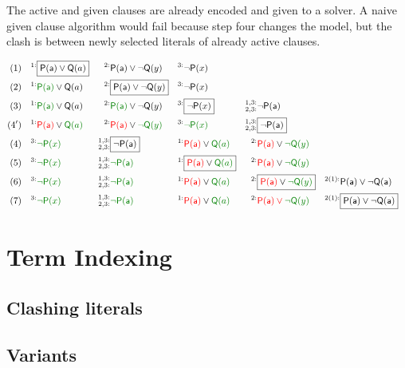 \begin{example}[InstGen]The active and given clauses are already encoded and given to a \SAT solver.
	A naive given clause algorithm would fail because step four changes the model, 
	but the clash is between newly selected literals of already active clauses.
	
	\begin{align*}
	(1)\quad^{1:}&\boxed{\mP(\ma)\lor\mQ(a)} & ^{2:}&\mP(\ma)\lor\lnot\mQ(y) & ^{3:}&\lnot\mP(x)
	\\
	(2)\quad^{1:}&{\colHi\mP(\ma)}\lor\mQ(a) & ^{2:}&\boxed{\mP(\ma)\lor\lnot\mQ(y)} & ^{3:}&\lnot\mP(x) 
	\\
	(3)\quad^{1:}&{\colHi\mP(\ma)}\lor\mQ(a) & ^{2:}&{\colHi\mP(\ma)}\lor\lnot\mQ(y) & ^{3:}&\boxed{\lnot\mP(x)} 
	& ^{1,3:}_{2,3:}&\lnot\mP(\ma)
	\\
	(4')\quad
	^{1:}&{\colLo\mP(\ma)}\lor\colHi\mQ(a) & ^{2:}&{\colLo\mP(\ma)}\lor\colHi\lnot\mQ(y) & ^{3:}&{\colHi\lnot\mP(x)} 
	& ^{1,3:}_{2,3:}&\boxed{\lnot\mP(\ma)}
	\\
	(4)\quad^{3:}&{\colHi\lnot\mP(x)} 
	& ^{1,3:}_{2,3:}&\boxed{\lnot\mP(\ma)}
	& ^{1:}&{\colLo\mP(\ma)}\lor\colHi\mQ(a) & ^{2:}&{\colLo\mP(\ma)}\lor\colHi\lnot\mQ(y)
	\\
	(5)\quad^{3:}&{\colHi\lnot\mP(x)} 
	& ^{1,3:}_{2,3:}&\colHi\lnot\mP(\ma)
	& ^{1:}&\boxed{{\colLo\mP(\ma)}\lor\colHi\mQ(a)} & ^{2:}&{\colLo\mP(\ma)}\lor\colHi\lnot\mQ(y)
	\\
	(6)\quad^{3:}&{\colHi\lnot\mP(x)} 
	& ^{1,3:}_{2,3:}&\colHi\lnot\mP(\ma)
	& ^{1:}&{\colLo\mP(\ma)}\lor\colHi\mQ(a) & ^{2:}&\boxed{{\colLo\mP(\ma)}\lor\colHi\lnot\mQ(y)}
	& ^{2(1):}&\mP(\ma)\lor\lnot\mQ(\ma)
	\\
	(7)\quad^{3:}&{\colHi\lnot\mP(x)} 
	& ^{1,3:}_{2,3:}&\colHi\lnot\mP(\ma)
	& ^{1:}&{\colLo\mP(\ma)}\lor\colHi\mQ(a) & ^{2:}&{\colLo\mP(\ma)\lor\colHi\lnot\mQ(y)}
	& ^{2(1):}&\boxed{\mP(\ma)\lor\lnot\mQ(\ma)}
	\end{align*}
\end{example}

\section{Term Indexing}

\subsection{Clashing literals}

\subsection{Variants}



